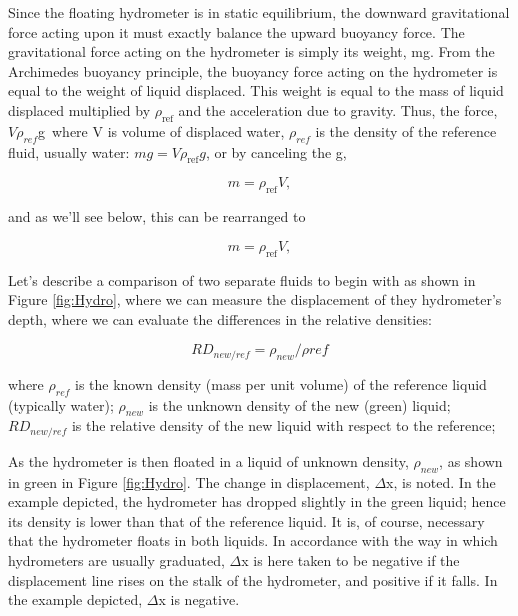 \documentclass{tufte-handout}
\begin{document}
Since the floating hydrometer is in static equilibrium, the downward gravitational force acting upon it must exactly balance the upward buoyancy force. The gravitational force acting on the hydrometer is simply its weight, mg. From the Archimedes buoyancy principle, the buoyancy force acting on the hydrometer is equal to the weight of liquid displaced. This weight is equal to the mass of liquid displaced multiplied by $\rho_\mathrm{ref}$ and the acceleration due to gravity. Thus, the force, $V\rho_{ref}$g\, where V is volume of displaced water, $\rho_{ref}$ is the density of the reference fluid, usually water:  $mg = V\rho_\mathrm{ref}g$, or by canceling the g, 

\begin{equation}\label{eq:massdisplaced}
m = \rho_\mathrm{ref} V,
\end{equation}

and as we'll see below, this can be rearranged to 

\begin{equation}\label{eq:archmidies}
m = \rho_\mathrm{ref} V,
\end{equation}

Let's describe a comparison of two separate fluids to begin with as shown in Figure \ref{fig:Hydro}, where we can measure the displacement of they hydrometer's depth, where we can evaluate the differences in the relative densities: 

\begin{equation}
RD_{new/ref} = \rho_{new}/\rho{ref}
\end{equation}

\noindent where $\rho_{ref}$ is the known density (mass per unit volume) of the reference liquid (typically water);
$\rho_{new}$ is the unknown density of the new (green) liquid;
$RD_{new/ref}$ is the relative density of the new liquid with respect to the reference;

As the hydrometer is then floated in a liquid of unknown density, $\rho_{new}$, as shown in green in Figure \ref{fig:Hydro}. The change in displacement, $\Delta$x, is noted. In the example depicted, the hydrometer has dropped slightly in the green liquid; hence its density is lower than that of the reference liquid. It is, of course, necessary that the hydrometer floats in both liquids. In accordance with the way in which hydrometers are usually graduated, $\Delta$x is here taken to be negative if the displacement line rises on the stalk of the hydrometer, and positive if it falls. In the example depicted, $\Delta$x is negative.
\end{document}
